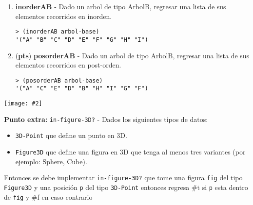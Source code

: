 \documentclass{article}
\newcommand{\grade}[1]{(\textbf{#1pts}) }
\newcommand{\jimage}[2]{\texttt{[image: \#2]}\vskip10pt}
\begin{document}
\begin{itemize}
\begin{enumerate}
\item  \textbf{inorderAB}  - Dado un arbol de tipo ArbolB, regresar una lista de sus elementos recorridos en inorden.
\begin{verbatim}
> (inorderAB arbol-base)
'("A" "B" "C" "D" "E" "F" "G" "H" "I")
\end{verbatim}

\item \grade {} \textbf{posorderAB} - Dado un arbol de tipo ArbolB, regresar una lista de sus elementos recorridos en post-orden.
\begin{verbatim}
> (posorderAB arbol-base)
'("A" "C" "E" "D" "B" "H" "I" "G" "F")
\end{verbatim}
   
\end{enumerate}

\jimage{0.8}{imgs/orders.png}
\end{itemize}

\textbf{Punto extra:} \texttt{in-figure-3D?} - Dados los siguientes tipos de datos:
\begin{itemize}
\item{ \texttt{3D-Point} que define un punto en 3D.}
\item{\texttt{Figure3D} que define una figura en 3D que tenga al menos tres variantes (por ejemplo: Sphere, Cube)}.
\end{itemize}
Entonces se debe implementar \texttt{in-figure-3D?} que tome una figura \texttt{fig} del tipo \texttt{Figure3D} y una posición \texttt{p} del tipo \texttt{3D-Point} entonces regresa \#t si \texttt{p} esta dentro de \texttt{fig} y \#f en caso contrario
\end{document}
